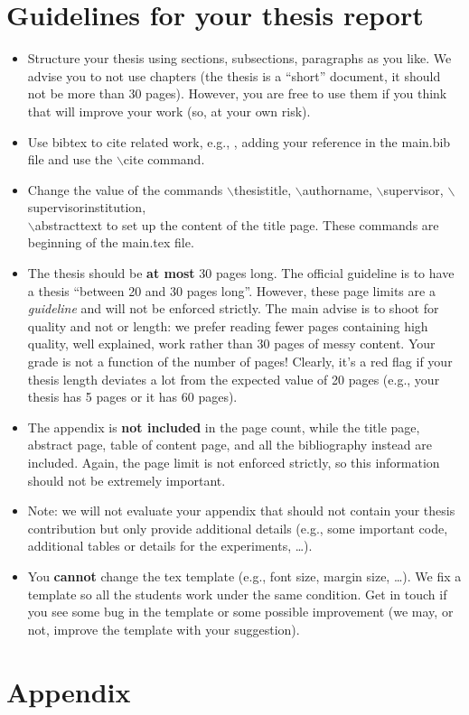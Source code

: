 \documentclass[oneside, a4paper, onecolumn, 11pt]{article}
\begin{document}
\section{Guidelines for your thesis report}

\begin{itemize}
    \item Structure your thesis using sections, subsections, paragraphs as you like. We advise you to not use chapters (the thesis is a ``short'' document, it should not be more than 30 pages). However, you are free to use them if you think that will improve your work (so, at your own risk).
    \item Use bibtex to cite related work, e.g., \cite{DBLP:journals/x/Turing37}, adding your reference in the {main.bib} file and use the {$\backslash$cite} command.
    \item Change the value of the commands {$\backslash$thesistitle}, {$\backslash$authorname}, {$\backslash$supervisor}, {$\backslash$supervisorinstitution}, \\ {$\backslash$abstracttext} to set up the content of the title page. These commands are beginning of the {main.tex} file.
    \item The thesis should be \textbf{at most} 30 pages long. The official guideline is to have a thesis ``between 20 and 30 pages long''. However, these page limits are a \emph{guideline} and will not be enforced strictly.
          The main advise is to shoot for quality and not or length: we prefer reading fewer pages containing high quality, well explained, work rather than 30 pages of messy content. Your grade is not a function of the number of pages!
          Clearly, it's a red flag if your thesis length deviates a lot from the expected value of 20 pages (e.g., your thesis has 5 pages or it has 60 pages).
    \item The appendix is \textbf{not included} in the page count, while the title page, abstract page, table of content page, and all the bibliography instead are included. Again, the page limit is not enforced strictly, so this information should not be extremely important.
    \item Note: we will not evaluate your appendix that should not contain your thesis contribution but only provide additional details (e.g., some important code, additional tables or details for the experiments, \ldots).
    \item You \textbf{cannot} change the tex template (e.g., font size, margin size, \ldots). We fix a template so all the students work under the same condition. Get in touch if you see some bug in the template or some possible improvement (we may, or not, improve the template with your suggestion).
\end{itemize}

\newpage



\newpage
\appendix

\section{Appendix}
\label{sec:appendix}
\end{document}
